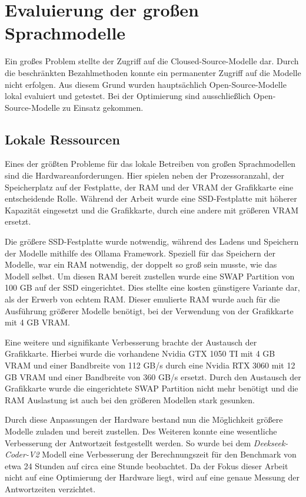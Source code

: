 \section{Evaluierung der großen Sprachmodelle}
Ein großes Problem stellte der Zugriff auf die Cloused-Source-Modelle dar. Durch die beschränkten Bezahlmethoden konnte ein permanenter Zugriff auf die Modelle nicht erfolgen. Aus diesem Grund wurden hauptsächlich Open-Source-Modelle lokal evaluiert und getestet. Bei der Optimierung sind ausschließlich Open-Source-Modelle zu Einsatz gekommen.


\subsection{Lokale Ressourcen}
Eines der größten Probleme für das lokale Betreiben von großen Sprachmodellen sind die Hardwareanforderungen. Hier spielen neben der Prozessoranzahl, der Speicherplatz auf der Festplatte, der RAM und der VRAM der Grafikkarte eine entscheidende Rolle. Während der Arbeit wurde eine SSD-Festplatte mit höherer Kapazität eingesetzt und die Grafikkarte, durch eine andere mit größeren VRAM ersetzt.\vspace{0.2cm}

Die größere SSD-Festplatte wurde notwendig, während des Ladens und Speichern der Modelle mithilfe des Ollama Framework. Speziell für das Speichern der Modelle, war ein RAM notwendig, der doppelt so groß sein musste, wie das Modell selbst. Um diesen RAM bereit zustellen wurde eine SWAP Partition von 100 GB auf der SSD eingerichtet. Dies stellte eine kosten günstigere Variante dar, als der Erwerb von echtem RAM. Dieser emulierte RAM wurde auch für die Ausführung größerer Modelle benötigt, bei der Verwendung von der Grafikkarte mit 4 GB VRAM.\vspace{0.2cm}

Eine weitere und signifikante Verbesserung brachte der Austausch der Grafikkarte. Hierbei wurde die vorhandene Nvidia GTX 1050 TI mit 4 GB \acrshort{VRAM} und einer Bandbreite von 112 GB/s durch eine Nvidia RTX 3060 mit 12 GB VRAM und einer Bandbreite von 360 GB/s ersetzt. Durch den Austausch der Grafikkarte wurde die eingerichtete SWAP Partition nicht mehr benötigt und die RAM Auslastung ist auch bei den größeren Modellen stark gesunken.

Durch diese Anpassungen der Hardware bestand nun die Möglichkeit größere Modelle zuladen und bereit zustellen. Des Weiteren konnte eine wesentliche Verbesserung der Antwortzeit festgestellt werden. So wurde bei dem \textit{Deekseek-Coder-V2} Modell eine Verbesserung der Berechnungszeit für den Benchmark von etwa 24 Stunden auf circa eine Stunde beobachtet. Da der Fokus dieser Arbeit nicht auf eine Optimierung der Hardware liegt, wird auf eine genaue Messung der Antwortzeiten verzichtet.\vspace{0.2cm}

